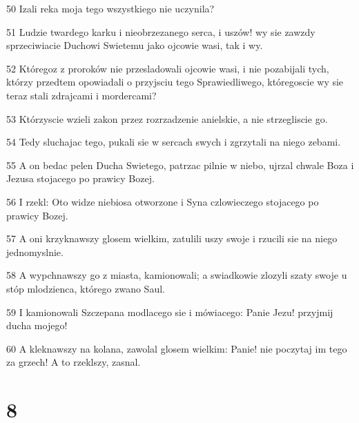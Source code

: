 \par 50 Izali reka moja tego wszystkiego nie uczynila?
\par 51 Ludzie twardego karku i nieobrzezanego serca, i uszów! wy sie zawzdy sprzeciwiacie Duchowi Swietemu jako ojcowie wasi, tak i wy.
\par 52 Któregoz z proroków nie przesladowali ojcowie wasi, i nie pozabijali tych, którzy przedtem opowiadali o przyjsciu tego Sprawiedliwego, któregoscie wy sie teraz stali zdrajcami i mordercami?
\par 53 Którzyscie wzieli zakon przez rozrzadzenie anielskie, a nie strzegliscie go.
\par 54 Tedy sluchajac tego, pukali sie w sercach swych i zgrzytali na niego zebami.
\par 55 A on bedac pelen Ducha Swietego, patrzac pilnie w niebo, ujrzal chwale Boza i Jezusa stojacego po prawicy Bozej.
\par 56 I rzekl: Oto widze niebiosa otworzone i Syna czlowieczego stojacego po prawicy Bozej.
\par 57 A oni krzyknawszy glosem wielkim, zatulili uszy swoje i rzucili sie na niego jednomyslnie.
\par 58 A wypchnawszy go z miasta, kamionowali; a swiadkowie zlozyli szaty swoje u stóp mlodzienca, którego zwano Saul.
\par 59 I kamionowali Szczepana modlacego sie i mówiacego: Panie Jezu! przyjmij ducha mojego!
\par 60 A kleknawszy na kolana, zawolal glosem wielkim: Panie! nie poczytaj im tego za grzech! A to rzeklszy, zasnal.

\chapter{8}


